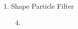 \documentclass[]{report}
\newlength\figureheight
\newlength\figurewidth
\begin{document}
\begin{enumerate}
		\item Shape Particle Filter
			\begin{enumerate}
				\setcounter{enumii}{3}
				\item
				
				\setlength\figureheight{3.5cm}
				\setlength{}
				\begin{figure}
%						
					\caption{}
					\label{fig:box}
				\end{figure}
			\end{enumerate}
			
	\end{enumerate}
	
\end{document}
